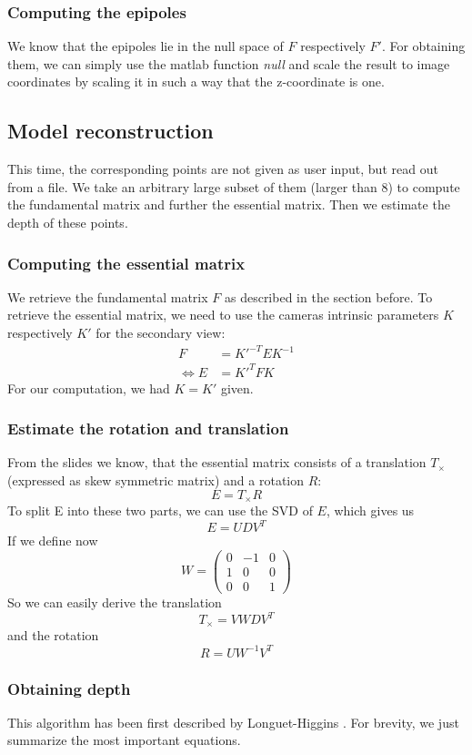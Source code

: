\documentclass{paper}
\begin{document}
\subsubsection{Computing the epipoles}
We know that the epipoles lie in the null space of $F$ respectively $F'$. For
obtaining them, we can simply use the matlab function \emph{null} and scale 
the result to image coordinates by scaling it in such a way that 
the z-coordinate is one.
 
\subsection{Model reconstruction}
This time, the corresponding points are not given as user input, but
read out from a file. We take an arbitrary large subset of them 
(larger than 8) to compute the fundamental
matrix and further the essential matrix. Then we estimate the depth of these points.

\subsubsection{Computing the essential matrix}
We retrieve the fundamental matrix $F$ as described in the section before. To
retrieve the essential matrix, we need to use the cameras intrinsic parameters $K$ respectively $K'$ for the secondary view:
\begin{align}
	 F &= K'^{-T} E K^{-1} \\
	\Longleftrightarrow E &= K'^T F K
\end{align}
For our computation, we had $K = K'$ given. 
\subsubsection{Estimate the rotation and translation}

From the slides we know, that the essential matrix consists of a translation $T_\times$ (expressed as skew symmetric matrix) and a rotation $R$:
\begin{equation}
	E = T_\times R
\end{equation}
To split E into these two parts, we can use the SVD of $E$, which gives us
\begin{equation}
	E = UDV^T
\end{equation}
If we define now
\begin{equation}
 W = \begin{pmatrix}
 	0 & -1 & 0 \\
 	1 & 0 & 0 \\
 	0 & 0 & 1
 \end{pmatrix}
\end{equation}
So we can easily derive the translation
\begin{equation}
T_\times = V W D V^T
\end{equation}
and the rotation
\begin{equation}
R = U W^{-1} V^T
\end{equation}

\subsubsection{Obtaining depth}
This algorithm has been first described by Longuet-Higgins \cite{Longuet-Higgins87}. For brevity, we just summarize the most important equations.




\end{document}
